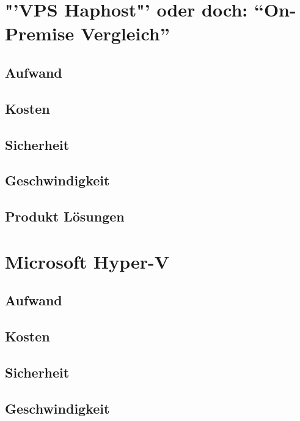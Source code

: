 \section{"'VPS Haphost"' oder doch: "`On-Premise Vergleich"'}
\subsection{Aufwand}

\subsection{Kosten}

\subsection{Sicherheit}

\subsection{Geschwindigkeit}

\subsection{Produkt Lösungen}



\section{Microsoft Hyper-V}
\subsection{Aufwand}

\subsection{Kosten}

\subsection{Sicherheit}

\subsection{Geschwindigkeit}

